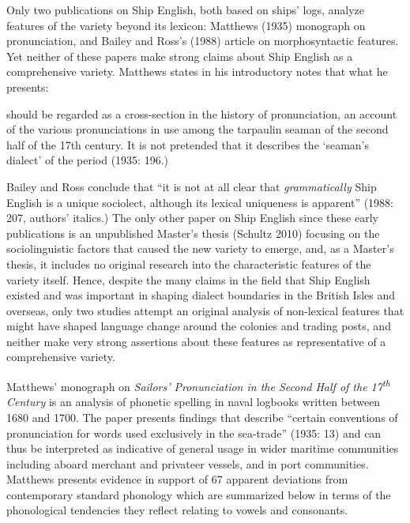\begin{styleStandard}
Only two publications on Ship English, both based on ships’ logs, analyze features of the variety beyond its lexicon: Matthews (1935) monograph on pronunciation, and Bailey and Ross’s (1988) article on morphosyntactic features. Yet neither of these papers make strong claims about Ship English as a comprehensive variety. Matthews states in his introductory notes that what he presents:
\end{styleStandard}


\begin{styleStandard}
should be regarded as a cross-section in the history of pronunciation, an account of the various pronunciations in use among the tarpaulin seaman of the second half of the 17th century. It is not pretended that it describes the ‘seaman’s dialect’ of the period (1935: 196.)
\end{styleStandard}


\begin{styleStandard}
Bailey and Ross conclude that “it is not at all clear that \textit{grammatically} Ship English is a unique sociolect, although its lexical uniqueness is apparent” (1988: 207, authors’ italics.) The only other paper on Ship English since these early publications is an unpublished Master’s thesis (Schultz 2010) focusing on the sociolinguistic factors that caused the new variety to emerge, and, as a Master’s thesis, it includes no original research into the characteristic features of the variety itself. Hence, despite the many claims in the field that Ship English existed and was important in shaping dialect boundaries in the British Isles and overseas, only two studies attempt an original analysis of non-lexical features that might have shaped language change around the colonies and trading posts, and neither make very strong assertions about these features as representative of a comprehensive variety. \ 
\end{styleStandard}


\begin{styleStandard}
Matthews’ monograph on \textit{Sailors’ Pronunciation in the Second Half of the 17}\textit{\textsuperscript{th}}\textit{ Century} is an analysis of phonetic spelling in naval logbooks written between 1680 and 1700. The paper presents findings that describe “certain conventions of pronunciation for words used exclusively in the sea-trade” (1935: 13) and can thus be interpreted as indicative of general usage in wider maritime communities including aboard merchant and privateer vessels, and in port communities. Matthews presents evidence in support of 67 apparent deviations from contemporary standard phonology which are summarized below in terms of the phonological tendencies they reflect relating to vowels and consonants. 
\end{styleStandard}


